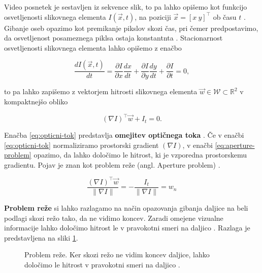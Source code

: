 Video posnetek je sestavljen iz sekvence slik, to pa lahko opišemo kot funkcijo osvetljenosti slikovnega elementa $I(\vec{x},t)$, na poziciji $\vec{x} = [x~y]^\top$ ob času $t$ \cite{wedel2011stereo}. Gibanje oseb opazimo kot premikanje pikslov skozi čas, pri čemer predpostavimo, da osvetljenost posameznega piklsa ostaja konstantnta \cite{trucco1998introductory}. Stacionarnost osvetljenosti slikovnega elementa lahko opišemo z enačbo  

\begin{equation}
	\frac{d I(\vec{x}, t)}{dt} = \frac{\partial I}{\partial x} \frac{dx}{dt} + \frac{\partial I}{\partial y} \frac{dy}{dt} + \frac{\partial I}{\partial t} = 0,
\end{equation}

to pa lahko zapišemo z vektorjem hitrosti slikovnega elementa $\vec{w} \in \mathcal{W} \subset \mathbb{R}^2$ v kompaktnejšo obliko

\begin{equation}\label{eq:opticni-tok}
	(\nabla I)^\top \vec{w} + I_t = 0.
\end{equation}

Enačba \eqref{eq:opticni-tok} predstavlja \textbf{omejitev optičnega toka} \cite{trucco1998introductory}. Če v enačbi \eqref{eq:opticni-tok} normaliziramo prostorski gradient $(\nabla I)$, v enačbi \eqref{eq:aperture-problem} opazimo, da lahko  določimo le hitrost, ki je vzporedna prostorskemu gradientu. Pojav je znan kot problem reže (angl. Aperture problem) \cite{trucco1998introductory}. 

\begin{equation}\label{eq:aperture-problem}
	\frac{(\nabla I)^\top \vec{w}}{\| \nabla I \|} = - \frac{I_t}{\| \nabla I \|} = w_n
\end{equation}

\textbf{Problem reže} si lahko razlagamo na način opazovanja gibanja daljice na beli podlagi skozi režo tako, da ne vidimo koncev. Zaradi omejene vizualne informacije lahko določimo hitrost le v pravokotni smeri na daljico \cite{trucco1998introductory}. Razlaga je predstavljena na sliki \ref{fig:aperture-problem}.




\begin{figure}[htb]
\centering

\caption[Problem reže]{Problem reže. Ker skozi režo ne vidim koncev daljice, lahko določimo le hitrost v pravokotni smeri na daljico \cite{trucco1998introductory}.}
\label{fig:aperture-problem}
\end{figure}




